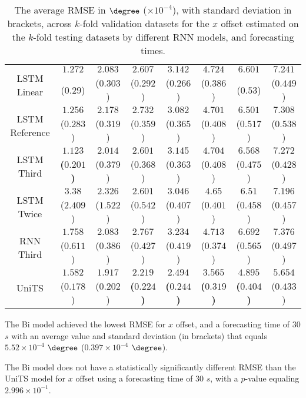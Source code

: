 \begin{table}[!ht]
{\begin{tabular}{|c|c|c|c|c|c|c|c|}
			\multirow{2}{*}{LSTM Linear} & $1.272$ & $2.083$ & $2.607$ & $3.142$ & $4.724$ & $6.601$ & $7.241$ \\
			 & ($0.29$) & ($0.303$) & ($0.292$) & ($0.266$) & ($0.386$) & ($0.53$) & ($0.449$) \\ \hline
			\multirow{2}{*}{LSTM Reference} & $1.256$ & $2.178$ & $2.732$ & $3.082$ & $4.701$ & $6.501$ & $7.308$ \\
			 & ($0.283$) & ($0.319$) & ($0.359$) & ($0.365$) & ($0.408$) & ($0.517$) & ($0.538$) \\ \hline
			\multirow{2}{*}{LSTM Third} & $\mathbf{1.123}$ & $2.014$ & $2.601$ & $3.145$ & $4.704$ & $6.568$ & $7.272$ \\
			 & \textbf{(}$\mathbf{0.201}$\textbf{)} & ($0.379$) & ($0.368$) & ($0.363$) & ($0.408$) & ($0.475$) & ($0.428$) \\ \hline
			\multirow{2}{*}{LSTM Twice} & $3.38$ & $2.326$ & $2.601$ & $3.046$ & $4.65$ & $6.51$ & $7.196$ \\
			 & ($2.409$) & ($1.522$) & ($0.542$) & ($0.407$) & ($0.401$) & ($0.458$) & ($0.457$) \\ \hline
			\multirow{2}{*}{RNN Third} & $1.758$ & $2.083$ & $2.767$ & $3.234$ & $4.713$ & $6.692$ & $7.376$ \\
			 & ($0.611$) & ($0.386$) & ($0.427$) & ($0.419$) & ($0.374$) & ($0.565$) & ($0.497$) \\ \hline
			\multirow{2}{*}{UniTS} & $1.582$ & $1.917$ & $\mathbf{2.219}$ & $\mathbf{2.494}$ & $\mathbf{3.565}$ & $\mathbf{4.895}$ & $5.654$ \\
			 & ($0.178$) & ($0.202$) & \textbf{(}$\mathbf{0.224}$\textbf{)} & \textbf{(}$\mathbf{0.244}$\textbf{)} & \textbf{(}$\mathbf{0.319}$\textbf{)} & \textbf{(}$\mathbf{0.404}$\textbf{)} & ($0.433$) \\ \hline
		\end{tabular}
	}
	\caption{The average RMSE in $\degree$ ($\times 10^{-4}$), with standard deviation in brackets, across $k$-fold validation datasets for the $x$ offset estimated on the $k$-fold testing datasets by different RNN models, and forecasting times.}
	\label{tab:wilcoxon_longitude_no_abs_RMSE}
\end{table}

The Bi model achieved the lowest RMSE for $x$ offset, and a forecasting time of $30$ $s$ with an average value and standard deviation (in brackets) that equals $5.52 \times 10^{-4}$ $\degree$ ($0.397 \times 10^{-4}$ $\degree$).

The Bi model does not have a statistically significantly different RMSE than the UniTS model for $x$ offset using a forecasting time of $30$ $s$, with a $p$-value equaling $2.996 \times 10^{-1}$.

